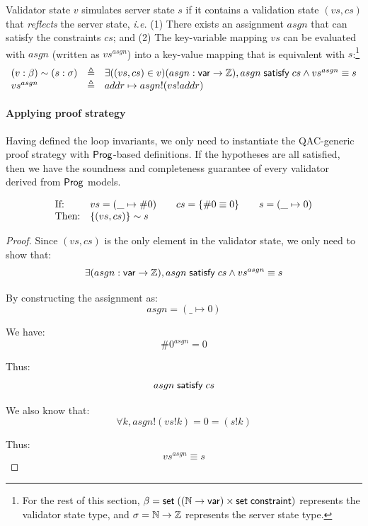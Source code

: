 \begin{definition}
  Validator state $v$ simulates server state $s$ if it contains a validation
  state $(vs,cs)$ that {\em reflects} the server state, {\it i.e.}  (1) There
  exists an assignment $asgn$ that can satisfy the constraints $cs$; and (2) The
  key-variable mapping $vs$ can be evaluated with $asgn$ (written as
  $vs^{asgn}$) into a key-value mapping that is equivalent with
  $s$:\footnote{For the rest of this section,
  $\beta=\mathsf{set}\;((\mathbb N\to\mathsf{var})\times\mathsf{set}\;\mathsf{constraint})$ represents the validator
  state type, and $\sigma=\mathbb N\to\mathbb Z$ represents the server state type.}
\[\begin{array}{lll} (v:\beta)\sim (s:\sigma)&\triangleq& \exists((vs,cs)\in
  v)(asgn:\mathsf{var}\to\mathbb Z),asgn\;\mathsf{satisfy}\;cs\wedge vs^{asgn}\equiv s\\
  vs^{asgn}&\triangleq&addr\mapsto asgn!(vs!addr) \end{array}\]
\end{definition}

\paragraph{Applying proof strategy}
Having defined the loop invariants, we only need to instantiate the QAC-generic
proof strategy with $\mathsf{Prog}$-based definitions.  If the hypotheses are all
satisfied, then we have the soundness and completeness guarantee of every
validator derived from $\mathsf{Prog}$ models.

\begin{lemma}[\ref{eq:rs1}]
\[\begin{array}{ll}
\text{If:}&
vs=(\_\mapsto\#0)\qquad
cs=\{\#0\equiv0\}\qquad
s=(\_\mapsto0)\\
\text{Then:}&\{(vs,cs)\}\sim s
\end{array}\]
\end{lemma}
\begin{proof}
Since $(vs,cs)$ is the only element in the validator state, we only need to show
that:
\[\exists(asgn:\mathsf{var}\to\mathbb Z),asgn\;\mathsf{satisfy}\;cs\wedge vs^{asgn}\equiv s\]

By constructing the assignment as: \[asgn=(\_\mapsto0)\]

We have: \[\#0^{asgn}=0\]

Thus: \[asgn\;\mathsf{satisfy}\;cs\]

We also know that: \[\forall k, asgn!(vs!k)=0=(s!k)\]

Thus: \[vs^{asgn}\equiv s\]
\end{proof}

